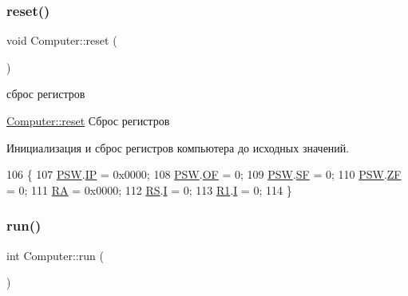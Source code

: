 \subsubsection{\texorpdfstring{reset()}{reset()}}
{\footnotesize\ttfamily void Computer\+::reset (\begin{DoxyParamCaption}{ }\end{DoxyParamCaption})\hspace{0.3cm}{\ttfamily [private]}}



сброс регистров 

\hyperlink{class_computer_aeab90cbacbef385685717c249a07929d}{Computer\+::reset} Сброс регистров

Инициализация и сброс регистров компьютера до исходных значений. 
\begin{DoxyCode}
106 \{
107     \hyperlink{class_computer_aada011a29d87bb979835371a5f09805e}{PSW}.\hyperlink{struct_computer_1_1bits_a7781883b446209714ad687e2a4f77526}{IP} = 0x0000;
108     \hyperlink{class_computer_aada011a29d87bb979835371a5f09805e}{PSW}.\hyperlink{struct_computer_1_1bits_aaec5be5e3ab9ea9aa4b1672af9e26312}{OF} = 0;
109     \hyperlink{class_computer_aada011a29d87bb979835371a5f09805e}{PSW}.\hyperlink{struct_computer_1_1bits_a74cfe87f17ba348db37c74bbd5e56828}{SF} = 0;
110     \hyperlink{class_computer_aada011a29d87bb979835371a5f09805e}{PSW}.\hyperlink{struct_computer_1_1bits_a5307edeadd212f1fc19e9f6f5346df39}{ZF} = 0;
111     \hyperlink{class_computer_a499d0b2c857c2977dd5702906705f79e}{RA} = 0x0000;
112     \hyperlink{class_computer_a874503110664b3cf821118d2ce9c2b96}{RS}.\hyperlink{union_computer_1_1data_a6e51de6e0351adc4e50b336a092bc4bb}{I} = 0;
113     \hyperlink{class_computer_a0fbf84599b7db9d634a92afed443ee73}{R1}.\hyperlink{union_computer_1_1data_a6e51de6e0351adc4e50b336a092bc4bb}{I} = 0;
114 \}
\end{DoxyCode}
\hypertarget{class_computer_af337e329e3bc6d80bbd7070e25ce5731}{}\label{class_computer_af337e329e3bc6d80bbd7070e25ce5731} 
\subsubsection{\texorpdfstring{run()}{run()}}
{\footnotesize\ttfamily int Computer\+::run (\begin{DoxyParamCaption}{ }\end{DoxyParamCaption})\hspace{0.3cm}{\ttfamily [private]}}



